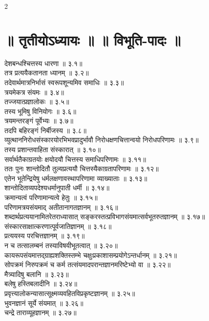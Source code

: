 \documentclass[9pt,a4paper,landscape]{article}
\begin{document}
\begin{multicols}{2}
\section*{॥ तृतीयोऽध्यायः ॥  ॥ विभूति-पादः ॥}
\begin{flushleft}
\devanagarifont
देशबन्धश्चित्तस्य धारणा ॥ ३.१॥\\
तत्र प्रत्ययैकतानता ध्यानम् ॥ ३.२॥\\
तदेवार्थमात्रनिर्भासं स्वरूपशून्यमिव समाधिः ॥ ३.३॥\\
त्रयमेकत्र संयमः ॥ ३.४॥\\
तज्जयात्प्रज्ञालोकः ॥ ३.५॥\\
तस्य भूमिषु विनियोगः ॥ ३.६॥\\
त्रयमन्तरङ्गं पूर्वेभ्यः ॥ ३.७॥\\
तदपि बहिरङ्गं निर्बीजस्य ॥ ३.८॥\\
व्युत्थाननिरोधसंस्कारयोरभिभवप्रादुर्भावौ निरोधक्षणचित्तान्वयो निरोधपरिणामः ॥ ३.९॥\\
तस्य प्रशान्तवाहिता संस्कारात् ॥ ३.१०॥\\
सर्वार्थतैकाग्रतयोः क्षयोदयौ चित्तस्य समाधिपरिणामः ॥ ३.११॥\\
ततः पुनः शान्तोदितौ तुल्यप्रत्ययौ चित्तस्यैकाग्रतापरिणामः ॥ ३.१२॥\\
एतेन भूतेन्द्रियेषु धर्मलक्षणावस्थापरिणामा व्याख्याताः ॥ ३.१३॥\\
शान्तोदिताव्यपदेश्यधर्मानुपाती धर्मी ॥ ३.१४॥\\
क्रमान्यत्वं परिणामान्यत्वे हेतुः ॥ ३.१५॥\\
परिणामत्रयसंयमाद् अतीतानागतज्ञानम् ॥ ३.१६॥\\
शब्दार्थप्रत्ययानामितरेतराध्यासात् सङ्करस्तत्प्रविभागसंयमात्सर्वभूतरुतज्ञानम् ॥ ३.१७॥\\
संस्कारसाक्षात्करणात्पूर्वजातिज्ञानम् ॥ ३.१८॥\\
प्रत्ययस्य परचित्तज्ञानम् ॥ ३.१९॥\\
न च तत्सालम्बनं तस्याविषयीभूतत्वात् ॥ ३.२०॥\\
कायरूपसंयमात्तद्ग्राह्यशक्तिस्तम्भे चक्षुःप्रकाशासम्प्रयोगेऽन्तर्धानम् ॥ ३.२१॥\\
सोपक्रमं निरुपक्रमं च कर्म तत्संयमादपरान्तज्ञानमरिष्टेभ्यो वा ॥ ३.२२॥\\
मैत्र्यादिषु बलानि ॥ ३.२३॥\\
बलेषु हस्तिबलादीनि ॥ ३.२४॥\\
प्रवृत्त्यालोकन्यासात्सूक्ष्मव्यवहितविप्रकृष्टज्ञानम् ॥ ३.२५॥\\
भुवनज्ञानं सूर्ये संयमात् ॥ ३.२६॥\\
चन्द्रे ताराव्यूहज्ञानम् ॥ ३.२७॥\\

\end{flushleft}
\end{multicols}
\end{document}
